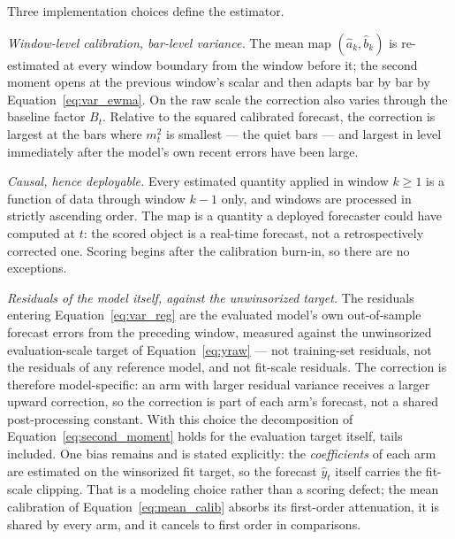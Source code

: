 Three implementation choices define the estimator.

\emph{Window-level calibration, bar-level variance.} The mean map
$(\hat{a}_k, \hat{b}_k)$ is re-estimated at every window boundary from
the window before it; the second moment opens at the previous window's
scalar and then adapts bar by bar by Equation~\eqref{eq:var_ewma}. On
the raw scale the correction also varies through the baseline factor
$B_t$. Relative to the squared calibrated forecast, the correction is
largest at the bars where $m_t^2$ is smallest --- the quiet bars ---
and largest in level immediately after the model's own recent errors
have been large.

\emph{Causal, hence deployable.} Every estimated quantity applied in
window $k \ge 1$ is a function of data through window $k-1$ only, and
windows are processed in strictly ascending order. The map is a quantity a
deployed forecaster could have computed at $t$: the scored object is a
real-time forecast, not a retrospectively corrected one. Scoring begins
after the calibration burn-in, so there are no exceptions.

\emph{Residuals of the model itself, against the unwinsorized target.} The
residuals entering Equation~\eqref{eq:var_reg} are the evaluated model's
own out-of-sample forecast errors from the preceding window, measured
against the unwinsorized evaluation-scale target of
Equation~\eqref{eq:yraw} --- not training-set residuals, not the residuals
of any reference model, and not fit-scale residuals. The correction is
therefore model-specific: an arm with larger residual variance receives a
larger upward correction, so the correction is part of each arm's
forecast, not a shared post-processing constant. With this choice the
decomposition of Equation~\eqref{eq:second_moment} holds for the
evaluation target itself, tails included. One bias remains and is stated
explicitly: the \emph{coefficients} of each arm are estimated on the
winsorized fit target, so the forecast $\hat{y}_t$ itself carries the
fit-scale clipping. That is a modeling choice rather than a scoring
defect; the mean calibration of Equation~\eqref{eq:mean_calib} absorbs its
first-order attenuation, it is shared by every arm, and it cancels to
first order in comparisons.


